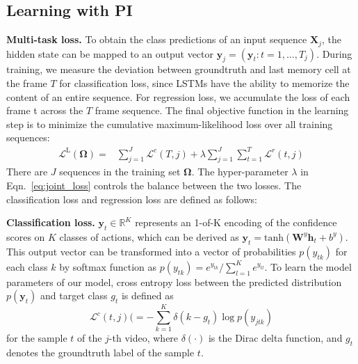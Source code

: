 \documentclass[10pt,twocolumn,letterpaper]{article}
\begin{document}
\subsection{Learning with PI}
\label{sec:learning}

\noindent \textbf{Multi-task loss.} To obtain the class predictions of an input sequence $\bm{X}_j$, the hidden state can be mapped to an output vector $\bm{y}_j=(\bm{y}_t: t=1,...,T_j)$. During training, we measure the deviation between groundtruth and last memory cell at the frame $T$ for classification loss, since LSTMs have the ability to memorize the content of an entire sequence. For regression loss, we accumulate the loss of each frame t across the $T$ frame sequence. The final objective function in the learning step is to minimize the cumulative maximum-likelihood loss over all training sequences: 
\vspace{-0.05cm}
\begin{align}
\mathcal{L}^{\mathrm{L}}(\bm{\Omega})=& 
\sum_{j=1}^{J}\mathcal{L}^{c}(T,j)+ \lambda \sum_{j=1}^{J}\sum_{t=1}^{T}\mathcal{L}^{r}(t,j)\label{eq:joint_loss}
\end{align}
There are $J$ sequences in the training set $\bm{\Omega}$. 
The hyper-parameter $\lambda$ in Eqn.~\ref{eq:joint_loss} controls the balance between the two losses. The classification loss and regression loss are defined as follows:



\noindent \textbf{Classification loss.}  $\bm{y}_t \in \mathbb{R}^K$ represents an 1-of-K encoding of the confidence scores on $K$ classes of actions, which can be derived as  $\bm{y}_{t}=\mathrm{tanh}(\bm{W}^{y}\bm{h}_{t}+b^{y})$. This output vector can be transformed into a vector of probabilities $p(y_{tk})$ for each class $k$ by softmax function as $p(y_{tk})=e^{y_{tk}}/\sum_{l=1}^{K}e^{y_{tl}}$. To learn the model parameters of our model, cross entropy loss between the predicted distribution $p(\bm{y}_{t})$ and target class $g_t$ is defined as 
$$\mathcal{L}^{c}(t,j)( =- \sum_{k=1}^{K} \delta (k-g_t)\log p(y_{jtk})$$ for the sample $t$ of the $j$-th video,
where $\delta(\cdot)$ is the Dirac delta function, and $g_t$ denotes the groundtruth label of the sample $t$. 
\end{document}
